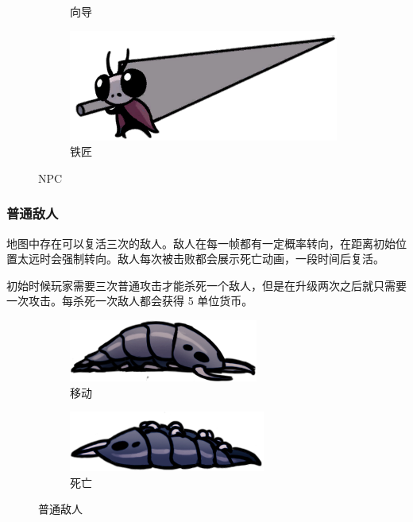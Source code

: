 \documentclass[12pt, twoside, a4paper]{article}
\begin{document}
\begin{figure}[h!]
\begin{subfigure}{0.15\textwidth}
        \caption{向导}
    \end{subfigure}
    \hspace{0.2\textwidth}
    \begin{subfigure}{0.4\textwidth}
        \includegraphics[width=\textwidth]{assets/report/blacksmith.png}
        \caption{铁匠}
    \end{subfigure}
    \caption{NPC}
\end{figure}

\subsubsection{普通敌人}

地图中存在可以复活三次的敌人。敌人在每一帧都有一定概率转向，在距离初始位置太远时会强制转向。敌人每次被击败都会展示死亡动画，一段时间后复活。

初始时候玩家需要三次普通攻击才能杀死一个敌人，但是在升级两次之后就只需要一次攻击。每杀死一次敌人都会获得 5 单位货币。

\begin{figure}[h!]
    \centering
    \begin{subfigure}{0.4\textwidth}
        \includegraphics[width=\textwidth]{assets/report/centipede_move0.png}
        \caption{移动}
    \end{subfigure}
    \hspace{0.05\textwidth}
    \begin{subfigure}{0.4\textwidth}
        \includegraphics[width=\textwidth]{assets/report/centipede_death.png}
        \caption{死亡}
    \end{subfigure}
    \caption{普通敌人}
\end{figure}
\end{document}
